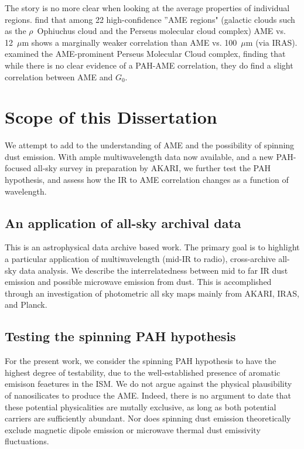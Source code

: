          The story is no more clear when looking at the average properties of individual regions. \cite{planckXV} find that among 22 high-confidence ''AME regions" (galactic clouds such as the $\rho$~Ophiuchus cloud and the Perseus molecular cloud complex) AME vs. 12~$\mu$m  shows a marginally weaker correlation than AME vs. 100~$\mu$m (via IRAS). \cite{tibbs11} examined the AME-prominent Perseus Molecular Cloud complex, finding that while there is no clear evidence of a PAH-AME correlation, they do find a slight correlation between AME and  $G_{0}$.

\section{Scope of this Dissertation}

    We attempt to add to the understanding of AME and the possibility of spinning dust emission. With ample multiwavelength data now available, and a new PAH-focused all-sky survey in preparation by AKARI, we further test the PAH hypothesis, and assess how the IR to AME correlation changes as a function of wavelength.

  \subsection{An application of all-sky archival data}
    This is an astrophysical data archive based work. The primary goal is to highlight a particular application of multiwavelength (mid-IR to radio), cross-archive all-sky data analysis. We describe the interrelatedness between mid to far IR dust emission and possible microwave emission from dust. This is accomplished through an investigation of photometric all sky maps mainly from AKARI, IRAS, and Planck.

  \subsection{Testing the spinning PAH hypothesis}
    For the present work, we consider the spinning PAH hypothesis to have the highest degree of testability, due to the well-established presence of aromatic emisison feaetures in the ISM.  We do not argue against the physical plausibility of nanosilicates to produce the AME. Indeed, there is no argument to date that these potential physicalities are mutally exclusive, as long as both potential carriers are sufficiently abundant. Nor does spinning dust emission theoretically exclude magnetic dipole emission or microwave thermal dust emissivity fluctuations.

